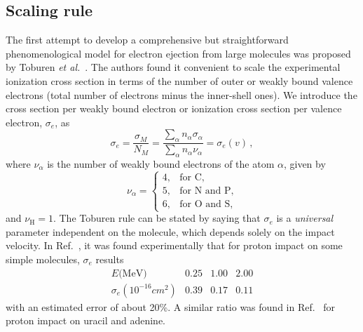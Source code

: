 \documentclass[preprint,12pt]{article}
\begin{document}
\subsection{Scaling rule}

The first attempt to develop a comprehensive but straightforward 
phenomenological model for electron ejection from large molecules was 
proposed by Toburen {\it et al.}~\cite{toburen1975,toburen1976}. 
The authors found it convenient to scale the experimental ionization 
cross section in terms of the number of outer or weakly bound valence 
electrons (total number of electrons minus the inner-shell ones). 
We introduce the cross section per weakly bound electron or ionization 
cross section per valence electron, $\sigma_{e}$, as
\begin{equation}
\sigma_{e}=\frac{\sigma_{M}}{N_{M}}=\frac{\sum\limits_{\alpha}
n_{\alpha}\sigma_{\alpha}}{\sum\limits_{\alpha}n_{\alpha}\nu_{\alpha}}
=\sigma_{e}(v)\,, 
\label{27} 
\end{equation}
where $\nu_{\alpha}$ is the number of weakly bound electrons of the atom
$\alpha$, given by
\begin{equation}
\nu_{\alpha}=\left\{ 
\begin{array}{ll}
4, & \text{for C,} \\ 
5, & \text{for N and P,} \\ 
6, & \text{for O and S,}
\end{array}\right.
\label{eq:nelec} 
\end{equation}
and $\nu_{\text{H}}=1$. The Toburen rule can be stated by saying that 
$\sigma_{e}$ is a \textit{universal} parameter independent on the 
molecule, which depends solely on the impact velocity. 
In Ref.~\cite{toburen1976}, it was found experimentally that for proton 
impact on some simple molecules, $\sigma_{e}$ results
\begin{equation}
\begin{array}{cccc}
E\text{(MeV)}               & 0.25 & 1.00 & 2.00 \\ 
\sigma_{e} (10^{-16}cm^{2}) & 0.39 & 0.17 & 0.11
\end{array}
\label{30}
\end{equation}
with an estimated error of about 20\%. A similar ratio was found in 
Ref.~\cite{itoh2013} for proton impact on uracil and adenine. 
\end{document}
